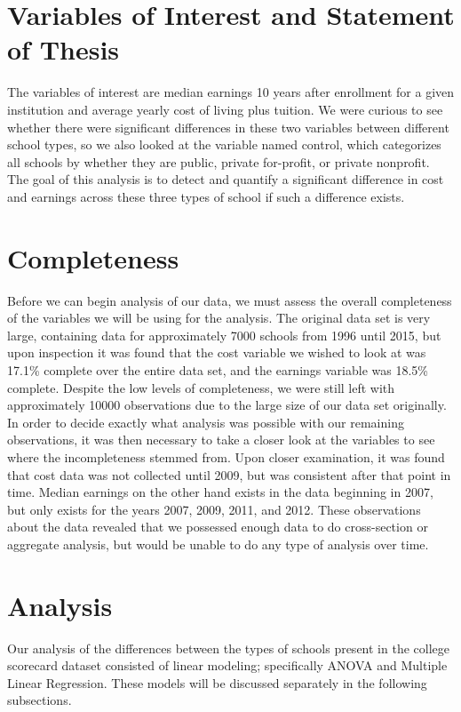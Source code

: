 \documentclass[%
 reprint,
 amsmath,amssymb,
 aps,
]{revtex4-1}
\begin{document}
\section{\label{sec:level1}Variables of Interest and Statement of Thesis}
The variables of interest are median earnings 10 years after enrollment for a given institution and average yearly cost of living plus tuition.  We were curious to see whether there were significant differences in these two variables between different school types, so we also looked at the variable named control, which categorizes all schools by whether they are public, private for-profit, or private nonprofit. The goal of this analysis is to detect and quantify a significant difference in cost and earnings across these three types of school if such a difference exists.  

\section{\label{sec:level1}Completeness}
Before we can begin analysis of our data, we must assess the overall completeness of the variables we will be using for the analysis.  The original data set is very large, containing data for approximately 7000 schools from 1996 until 2015, but upon inspection it was found that the cost variable we wished to look at was 17.1\% complete over the entire data set, and the earnings variable was 18.5\% complete.  Despite the low levels of completeness, we were still left with approximately 10000 observations due to the large size of our data set originally.  In order to decide exactly what analysis was possible with our remaining observations, it was then necessary to take a closer look at the variables to see where the incompleteness stemmed from.  Upon closer examination, it was found that cost data was not collected until 2009, but was consistent after that point in time.  Median earnings on the other hand exists in the data beginning in 2007, but only exists for the years 2007, 2009, 2011, and 2012.  These observations about the data revealed that we possessed enough data to do cross-section or aggregate analysis, but would be unable to do any type of analysis over time.

\section{\label{sec:level1}Analysis}
Our analysis of the differences between the types of schools present in the college scorecard dataset consisted of linear modeling; specifically ANOVA and Multiple Linear Regression.  These models will be discussed separately in the following subsections. 
\end{document}
